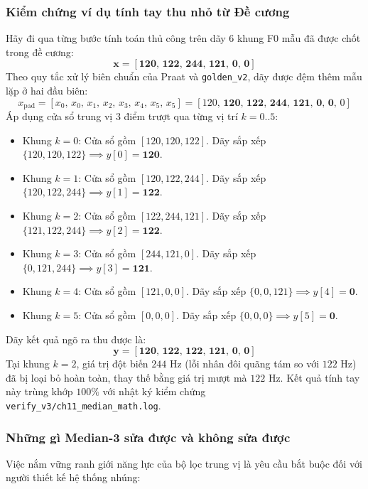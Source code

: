 \subsubsection*{Kiểm chứng ví dụ tính tay thu nhỏ từ Đề cương}
Hãy đi qua từng bước tính toán thủ công trên dãy 6 khung F0 mẫu đã được chốt trong đề cương:
\begin{equation}
    \mathbf{x = [120,\, 122,\, 244,\, 121,\, 0,\, 0]}
\end{equation}
Theo quy tắc xử lý biên chuẩn của Praat và \texttt{golden\_v2}, dãy được đệm thêm mẫu lặp ở hai đầu biên:
\begin{equation}
    x_{\text{pad}} = [x_0,\, x_0,\, x_1,\, x_2,\, x_3,\, x_4,\, x_5,\, x_5] = [120,\, \mathbf{120,\, 122,\, 244,\, 121,\, 0,\, 0},\, 0]
\end{equation}
Áp dụng cửa sổ trung vị 3 điểm trượt qua từng vị trí $k = 0..5$:
\begin{itemize}
    \item Khung $k = 0$: Cửa sổ gồm $[120, 120, 122]$. Dãy sắp xếp $\{120, 120, 122\} \implies y[0] = \mathbf{120}$.
    \item Khung $k = 1$: Cửa sổ gồm $[120, 122, 244]$. Dãy sắp xếp $\{120, 122, 244\} \implies y[1] = \mathbf{122}$.
    \item Khung $k = 2$: Cửa sổ gồm $[122, 244, 121]$. Dãy sắp xếp $\{121, 122, 244\} \implies y[2] = \mathbf{122}$.
    \item Khung $k = 3$: Cửa sổ gồm $[244, 121, 0]$. Dãy sắp xếp $\{0, 121, 244\} \implies y[3] = \mathbf{121}$.
    \item Khung $k = 4$: Cửa sổ gồm $[121, 0, 0]$. Dãy sắp xếp $\{0, 0, 121\} \implies y[4] = \mathbf{0}$.
    \item Khung $k = 5$: Cửa sổ gồm $[0, 0, 0]$. Dãy sắp xếp $\{0, 0, 0\} \implies y[5] = \mathbf{0}$.
\end{itemize}
Dãy kết quả ngõ ra thu được là:
\begin{equation}
    \mathbf{y = [120,\, 122,\, 122,\, 121,\, 0,\, 0]}
\end{equation}
Tại khung $k = 2$, giá trị đột biến $244\text{ Hz}$ (lỗi nhân đôi quãng tám so với $122\text{ Hz}$) đã bị loại bỏ hoàn toàn, thay thế bằng giá trị mượt mà $122\text{ Hz}$. Kết quả tính tay này trùng khớp $100\%$ với nhật ký kiểm chứng \texttt{verify\_v3/ch11\_median\_math.log}.

\subsubsection*{Những gì Median-3 sửa được và không sửa được}
Việc nắm vững ranh giới năng lực của bộ lọc trung vị là yêu cầu bắt buộc đối với người thiết kế hệ thống nhúng:

